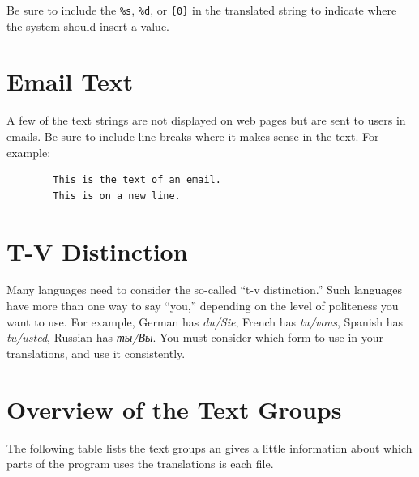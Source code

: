 \documentclass[11pt,oneside,a4paper]{memoir}
\begin{document}
Be sure to include the \verb|%s|, \verb|%d|, or \verb|{0}| in the translated string to indicate
where the system should insert a value.

\section{Email Text}\label{sec-email-text}

A few of the text strings are not displayed on web pages but are sent to users in emails. Be sure to
include line breaks where it makes sense in the text. For example:

\begin{verbatim}
        This is the text of an email.
        This is on a new line.
\end{verbatim}


\section{T-V Distinction}

Many languages need to consider the so-called ``t-v distinction.'' Such languages have more than one
way to say ``you,'' depending on the level of politeness you want to use. For example, German has
\emph{du/Sie}, French has \emph{tu/vous}, Spanish has \emph{tu/usted}, Russian has \emph{ты/Вы}. You
must consider which form to use in your translations, and use it consistently.


\section{Overview of the Text Groups}

The following table lists the text groups an gives a little information about which parts
of the program uses the translations is each file.
\end{document}
